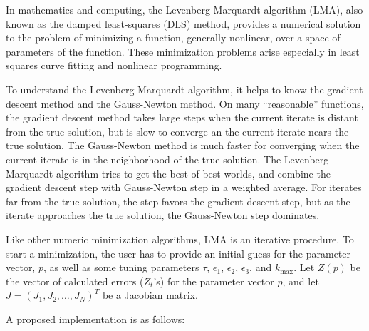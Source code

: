 \documentclass[english,12pt]{article}
\begin{document}
In mathematics and computing, the Levenberg-Marquardt algorithm (LMA),
also known as the damped least-squares (DLS) method, provides a
numerical solution to the problem of minimizing a function, generally
nonlinear, over a space of parameters of the function. These
minimization problems arise especially in least squares curve fitting
and nonlinear programming.

To understand the Levenberg-Marquardt algorithm, it helps to know the
gradient descent method and the Gauss-Newton method.  On many
``reasonable'' functions, the gradient descent method takes large
steps when the current iterate is distant from the true solution, but
is slow to converge an the current iterate nears the true solution.
The Gauss-Newton method is much faster for converging when the current
iterate is in the neighborhood of the true solution.  The
Levenberg-Marquardt algorithm tries to get the best of best worlds,
and combine the gradient descent step with Gauss-Newton step in a
weighted average.  For iterates far from the true solution, the step
favors the gradient descent step, but as the iterate approaches the
true solution, the Gauss-Newton step dominates.

Like other numeric minimization algorithms, LMA is an iterative
procedure.  To start a minimization, the user has to provide an
initial guess for the parameter vector, $p$, as well as some tuning
parameters $\tau$, $\epsilon_1$, $\epsilon_2$, $\epsilon_3$, and $k_{\max}$.
Let $Z(p)$ be the vector of calculated errors ($Z_t$'s) for the
parameter vector $p$, and let $J = {(J_{1}, J_{2}, \ldots, J_N)}^T$
be a Jacobian matrix.

A proposed implementation is as follows:
\end{document}
